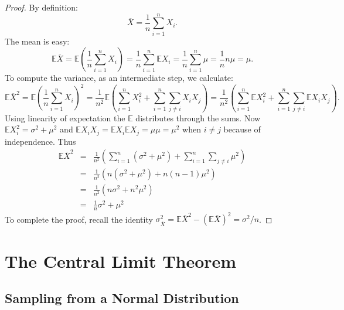 \begin{proof}
By definition: \[ \overline{X}=\frac{1}{n}\sum_{i=1}^nX_i .\]
The mean is easy:
\[ \mathbb{E} \overline{X}=\mathbb{E}\left(\frac{1}{n}\sum_{i=1}^{n}X_{i}\right)=\frac{1}{n}\sum_{i=1}^{n}\mathbb{E} X_{i}=\frac{1}{n}\sum_{i=1}^{n}\mu=\frac{1}{n}n\mu=\mu.  \]
To compute the variance, as an intermediate step, we calculate:
\[ \mathbb{E} \overline{X}^{2}=\mathbb{E}\left(\frac{1}{n}\sum_{i=1}^{n}X_{i}\right)^{2}=\frac{1}{n^2}\mathbb{E}\left(\sum_{i=1}^{n}X_{i}^{2}+\sum_{i=1}^{n}\sum_{j\ne i}X_{i}X_{j}\right)=\frac{1}{n^2}\left(\sum_{i=1}^{n}\mathbb{E}X_{i}^{2}+\sum_{i=1}^{n}\sum_{j\ne i}\mathbb{E}X_{i}X_{j}\right). \]
Using linearity of expectation the \(\mathbb{E}\) distributes through the sums.
Now \(\mathbb{E} X_{i}^{2}=\sigma^{2}+\mu^{2}\) and \(\mathbb{E} X_{i}X_{j}=\mathbb{E} X_{i}\mathbb{E} X_{j}=\mu\mu=\mu^2\) when \(i\neq j\) because of independence.
Thus
\begin{eqnarray*}
\mathbb{E} \overline{X}^{2} & = & \frac{1}{n^2} \left( \sum_{i=1}^{n}(\sigma^{2}+\mu^{2})+\sum_{i=1}^{n}\sum_{j\ne i}\mu^2 \right)\\
 & = & \frac{1}{n^2}\left( n(\sigma^2+\mu^2)+n(n-1)\mu^2 \right)\\
 & = & \frac{1}{n^2}\left( n\sigma^2+n^2\mu^2 \right)\\
 & = & \frac{1}{n}\sigma^2+\mu^2
\end{eqnarray*}
To complete the proof, recall the identity
\(\sigma_{\overline{X}}^{2}=\mathbb{E} \overline{X}^{2}-\left(\mathbb{E} \overline{X}\right)^{2}=\sigma^2/n\).
\end{proof}

\section{The Central Limit Theorem}

\subsection{Sampling from a Normal Distribution}
\label{sec-8-2-1}

